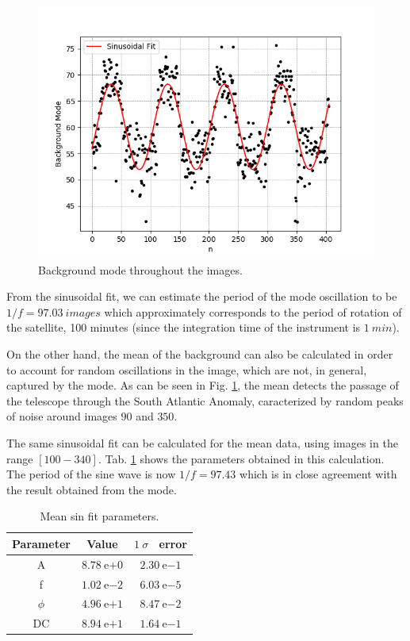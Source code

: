 \documentclass{aa}
\begin{document}
\begin{figure}[h]
\centering

\includegraphics[width=.4\textwidth]{background_mode.png}

\caption{Background mode throughout the images.}
\label{fig:mode}
\end{figure}

From the sinusoidal fit, we can estimate the period of the mode oscillation to be $1/f = 97.03\ images$ which approximately corresponds to the period of rotation of the satellite, 100 minutes (since the integration time of the instrument is $1\ min$).

On the other hand, the mean of the background can also be calculated in order to account for random oscillations in the image, which are not, in general, captured by the mode. As can be seen in Fig. \ref{tab:mean}, the mean detects the passage of the telescope through the South Atlantic Anomaly, caracterized by random peaks of noise around images $90$ and $350$.

The same sinusoidal fit can be calculated for the mean data, using images in the range $[100-340]$. Tab. \ref{tab:mean} shows the parameters obtained in this calculation. The period of the sine wave is now $1/f = 97.43$ which is in close agreement with the result obtained from the mode.

\begin{table}
\caption{Mean sin fit parameters.}
\label{tab:mean}
\centering
\begin{tabular}{c c c}
\hline
\noalign{\smallskip}
Parameter & Value & $1\ \sigma$ \ error \\
\hline
\noalign{\smallskip}
	A & $8.78\ \mathrm{e}{+0}$      & $2.30\ \mathrm{e}{-1}$ \\
	f & $1.02\ \mathrm{e}{-2}$      & $6.03\ \mathrm{e}{-5}$ \\
	$\phi$ & $4.96\ \mathrm{e}{+1}$ & $8.47\ \mathrm{e}{-2}$ \\
	DC & $8.94\ \mathrm{e}{+1}$     & $1.64\ \mathrm{e}{-1}$
\end{tabular}
\end{table}
\end{document}
